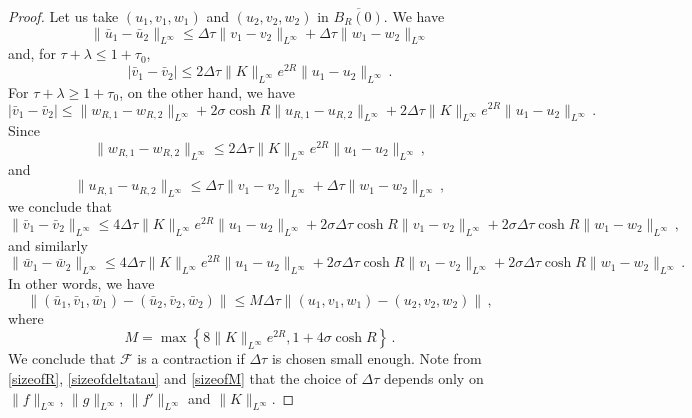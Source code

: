 \documentclass[10pt,a4paper]{amsart}
\newcommand{\cF}{\mathcal{F}}
\newcommand{\rig}{R}
\begin{document}
\begin{proof}
Let us take $(u_1,v_1,w_1)$ and $(u_2,v_2,w_2)$ in $\overline{B_R(0)}$. We have
\begin{equation}
\| \bar{u}_1 - \bar{u}_2 \|_{L^\infty} \leq \Delta \tau \| v_1 - v_2 \|_{L^\infty} + \Delta \tau \| w_1 - w_2 \|_{L^\infty}
\end{equation}
and, for $\tau + \lambda \leq 1 + \tau_0$,
\begin{equation}
| \bar{v}_1 - \bar{v}_2 | \leq 2 \Delta \tau  \| K \|_{L^\infty} e^{2R} \| u_1 - u_2 \|_{L^\infty} \, .
\end{equation}
For $ \tau + \lambda\geq 1 + \tau_0$, on the other hand, we have
\begin{equation}
| \bar{v}_1 - \bar{v}_2 | \leq \| w_{\rig,1} - w_{\rig,2} \|_{L^\infty} + 2 \sigma \cosh R \| u_{\rig,1} - u_{\rig,2} \|_{L^\infty} + 2 \Delta \tau  \| K \|_{L^\infty} e^{2R} \| u_1 - u_2 \|_{L^\infty} \, .
\end{equation}
Since
\begin{equation}
\| w_{\rig,1} - w_{\rig,2} \|_{L^\infty} \leq 2 \Delta \tau  \| K \|_{L^\infty} e^{2R} \| u_1 - u_2 \|_{L^\infty} \, ,
\end{equation}
and
\begin{equation}
\| u_{\rig,1} - u_{\rig,2} \|_{L^\infty} \leq \Delta \tau \| v_1 - v_2 \|_{L^\infty} + \Delta \tau \| w_1 - w_2 \|_{L^\infty} \, ,
\end{equation}
we conclude that
\begin{equation}
\| \bar{v}_1 - \bar{v}_2 \|_{L^\infty} \leq 4 \Delta \tau  \| K \|_{L^\infty} e^{2R} \| u_1 - u_2 \|_{L^\infty} + 2\sigma \Delta \tau \cosh R \| v_1 - v_2 \|_{L^\infty} + 2\sigma \Delta \tau \cosh R \| w_1 - w_2 \|_{L^\infty}  \, ,
\end{equation}
and similarly
\begin{equation}
\| \bar{w}_1 - \bar{w}_2 \|_{L^\infty} \leq 4 \Delta \tau  \| K \|_{L^\infty} e^{2R} \| u_1 - u_2 \|_{L^\infty} + 2\sigma \Delta \tau \cosh R \| v_1 - v_2 \|_{L^\infty} + 2\sigma \Delta \tau \cosh R \| w_1 - w_2 \|_{L^\infty}  \, .
\end{equation}
In other words, we have
\begin{equation}
\| (\bar{u}_1,\bar{v}_1,\bar{w}_1) - (\bar{u}_2,\bar{v}_2,\bar{w}_2) \| \leq  M \Delta \tau \| (u_1, v_1, w_1) - (u_2, v_2, w_2) \|  \, ,
\end{equation}
where
\begin{equation} \label{sizeofM}
M = \max \left\{ 8 \| K \|_{L^\infty} e^{2R}, 1 + 4 \sigma \cosh R \right\}  \, .
\end{equation}
We conclude that $\cF$ is a contraction if $\Delta \tau$ is chosen small enough. Note from \eqref{sizeofR}, \eqref{sizeofdeltatau} and \eqref{sizeofM} that the choice of $\Delta \tau$ depends only on $\| f \|_{L^\infty}$, $\| g \|_{L^\infty}$, $\| f' \|_{L^\infty}$ and $\| K \|_{L^\infty}$.


\end{proof}
\end{document}
